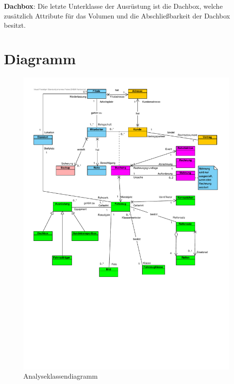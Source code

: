 \textbf{Dachbox}: Die letzte Unterklasse der Ausrüstung ist die Dachbox, welche zusätzlich Attribute für das Volumen und die Abschließbarkeit der Dachbox besitzt.


\newpage


\section{Diagramm}

\begin{figure}[!ht]
    \centering
    \includegraphics[width=\textwidth, trim = 0cm 9cm 0cm 0cm]{Bilder/Diagramme/Analyseklassendiagramm.pdf}
    \caption{Analyseklassendiagramm}
    \label{img:akd}
\end{figure}